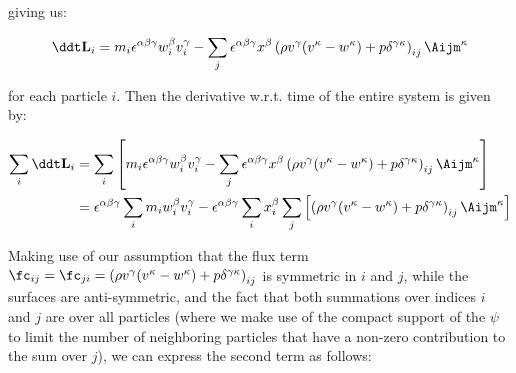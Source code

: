 giving us:

\begin{align}
\ddt \mathbf{L}_i =
    m_i \epsilon^{\alpha \beta \gamma} w_i^\beta v_i^\gamma
    -\sum_j \epsilon^{\alpha \beta \gamma} x^\beta
        \left( \rho v^\gamma (v^\kappa - w^\kappa) + p \delta^{\gamma\kappa} \right)_{ij}
\Aijm^\kappa
\end{align}

for each particle $i$. Then the derivative w.r.t. time of the entire system is given by:

\begin{align}
\sum_i \ddt \mathbf{L}_i &=
\sum_i \left[
    m_i \epsilon^{\alpha \beta \gamma} w_i^\beta v_i^\gamma
    -\sum_j \epsilon^{\alpha \beta \gamma} x^\beta
        \left( \rho v^\gamma (v^\kappa - w^\kappa)   + p \delta^{\gamma\kappa} \right)_{ij}
\Aijm^\kappa
\right] \\
&=  \epsilon^{\alpha \beta \gamma} \sum_i m_i w_i^\beta v_i^\gamma
-  \epsilon^{\alpha \beta \gamma} \sum_i x_i^\beta \sum_j \left[
   \left( \rho v^\gamma (v^\kappa - w^\kappa)  + p \delta^{\gamma\kappa} \right)_{ij} \Aijm^\kappa
\right]
\end{align}

Making use of our assumption that the flux term $\fc_{ij} = \fc_{ji} = \left( \rho v^\gamma
(v^\kappa - w^\kappa) + p \delta^{\gamma\kappa} \right)_{ij} $ is symmetric in $i$ and $j$, while
the surfaces \Aij are anti-symmetric, and the fact that both summations over indices $i$ and $j$ are over all particles (where we make use of the compact support of the $\psi$ to limit the number of neighboring particles that have a non-zero contribution to the sum over $j$), we can express the
second term as follows:

